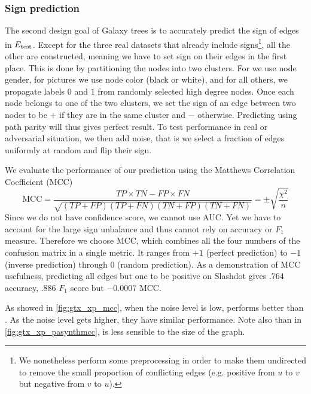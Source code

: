 \subsubsection{Sign prediction}

The second design goal of Galaxy trees is to accurately predict the sign of edges in $E_{\mathrm{test}}{}$.
Except for the three real datasets that already include signs\footnote{We nonetheless perform some
preprocessing in order to make them undirected to remove the small proportion of conflicting edges
(e.g. positive from $u$ to $v$ but negative from $v$ to $u$).}, all the other are constructed,
meaning we have to set sign on their edges in the first place. This is done by partitioning the
nodes into two clusters. For \gplus{} we use node gender, for pictures we use node color (black or
white), and for all others, we propagate labels $0$ and $1$ from randomly selected high degree nodes.
Once each node belongs to one of the two clusters, we set the sign of an edge between two nodes to
be $+$ if they are in the same cluster and $-$ otherwise.  Predicting using path parity will thus
gives perfect result. To test performance in real or adversarial situation, we then add noise, that
is we select a fraction of edges uniformly at random and flip their sign. 

We evaluate the performance of our prediction using the Matthews Correlation Coefficient (MCC)~\autocite{MCC00} \[
	\mathrm{MCC} = \frac{ TP \times TN - FP \times FN } {\sqrt{ (TP + FP) ( TP + FN ) (
			TN + FP ) ( TN + FN ) } } = \pm \sqrt{\frac{\chi^2}{n}}
\]
Since we do not have confidence score, we cannot use AUC. Yet we have to account for the large sign
unbalance and thus cannot rely on accuracy or $F_1$ measure.  Therefore we choose MCC, which
combines all the four numbers of the confusion matrix in a single metric. It ranges from $+1$
(perfect prediction) to $-1$ (inverse prediction) through $0$ (random prediction). As a
demonstration of MCC usefulness, predicting all edges but one to be positive on Slashdot gives
$.764$ accuracy, $.886$ $F_1$ score but
$-0.0007$ MCC.

As showed in \autoref{fig:gtx_xp_mcc}, when the noise level is low, \gtx{} performs better than
\bfs{}. As the noise level gets higher, they have similar performance. Note also than in
\autoref{fig:gtx_xp_pasynthmcc}, \gtx{} is less sensible to the size of the graph.

